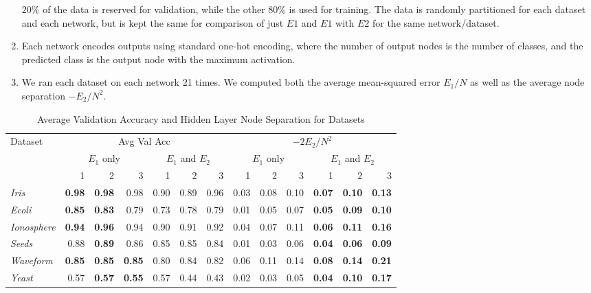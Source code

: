 \begin{enumerate}
  $20\%$ of the data is reserved for validation, while the other $80\%$ is
  used for training. The data is randomly partitioned for each dataset and
  each network, but is kept the same for comparison of just $E1$ and $E1$
  with $E2$ for the same network/dataset.
\item
  Each network encodes outputs using standard one-hot encoding, where the number
  of output nodes is the number of classes, and the predicted class is the
  output node with the maximum activation.
\item
  We ran each dataset on each network 21 times. We computed both the average
  mean-squared error $E_1/N$ as well as the average node separation
  $-E_2/N^2$.
\end{enumerate}

\begin{table*}[t!]
  \centering
  \small
  \begin{tabular}{|l|r|r|r|r|r|r|r|r|r|r|r|r|}
    \hline
    Dataset & 
    \multicolumn{6}{c|}{Avg Val Acc} & 
    \multicolumn{6}{c|}{$-2E_2/N^2$} \\
    \cline{2-13}
    & \multicolumn{3}{c|}{$E_1$ only} &
    \multicolumn{3}{c|}{$E_1$ and $E_2$} &
    \multicolumn{3}{c|}{$E_1$ only} &
    \multicolumn{3}{c|}{$E_1$ and $E_2$} \\
    \cline{2-13}
    & 1 & 2 & 3 & 1 & 2 & 3 & 1 & 2 & 3 & 1 & 2 & 3 \\
    \hline
    \textit{Iris} & \textbf{0.98} & \textbf{0.98} & 0.98 & 0.90 & 0.89 & 0.96 & 0.03 &0.08 & 0.10 & \textbf{0.07} & \textbf{0.10} & \textbf{0.13} \\
    \textit{Ecoli} & \textbf{0.85} & \textbf{0.83} & 0.79 & 0.73 & 0.78 & 0.79 & 0.01 & 0.05 & 0.07 & \textbf{0.05} & \textbf{0.09} & \textbf{0.10} \\
    \textit{Ionosphere} & \textbf{0.94} & \textbf{0.96} & 0.94 & 0.90 & 0.91 & 0.92 & 0.04 & 0.07 & 0.11 & \textbf{0.06} & \textbf{0.11} & \textbf{0.16} \\
    \textit{Seeds} & 0.88 & \textbf{0.89} & 0.86 & 0.85 & 0.85 & 0.84 & 0.01 & 0.03 & 0.06 & \textbf{0.04} & \textbf{0.06} & \textbf{0.09} \\
    \textit{Waveform} & \textbf{0.85} & \textbf{0.85} & \textbf{0.85} & 0.80 & 0.84 & 0.82 & 0.06 & 0.11 & 0.14 & \textbf{0.08} & \textbf{0.14} & \textbf{0.21} \\
    \textit{Yeast} & 0.57 & \textbf{0.57} & \textbf{0.55} & 0.57 & 0.44 & 0.43 & 0.02 & 0.03 & 0.05 & \textbf{0.04} & \textbf{0.10} & \textbf{0.17} \\
    \hline
  \end{tabular}
  \caption{Average Validation Accuracy and Hidden Layer Node Separation for Datasets }
  \label{tab:e1_e2_avgs}  
\end{table*}

